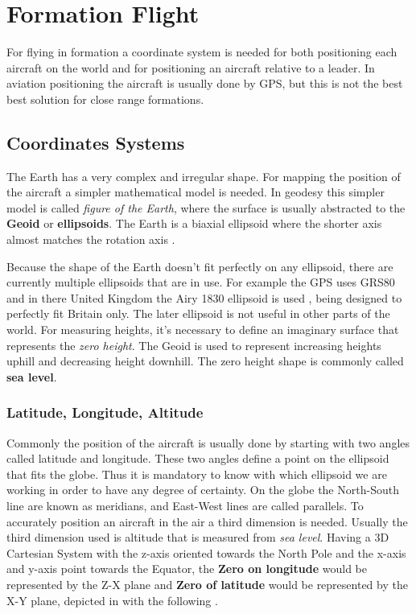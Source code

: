 \chapter{Formation Flight}
\label{chapter:formation-flight}
For flying in formation a coordinate system is needed for both positioning each 
aircraft on the world and for positioning an aircraft relative to a leader. In
aviation positioning the aircraft is usually done by GPS, but this is not the best best solution for close range formations.

\section{Coordinates Systems}
\label{sec:coordinates-systems}
The Earth has a very complex and irregular shape. For mapping the position of
the aircraft a simpler mathematical model is needed. In geodesy this simpler
model is called \textit{figure of the Earth}, where the surface is usually
abstracted to the \textbf{Geoid} or \textbf{ellipsoids}. The Earth is a biaxial 
ellipsoid where the shorter axis almost matches the rotation axis \cite{gb-coordinates}.

Because the shape of the Earth doesn't fit perfectly on any ellipsoid, there
are currently multiple ellipsoids that are in use. For example the GPS uses
GRS80 \cite{gsr80} and in there
United Kingdom the Airy 1830 ellipsoid is used \cite{gb-coordinates},  being 
designed to perfectly fit Britain only. The later ellipsoid is not useful in 
other parts of the world. For measuring heights, it's necessary to define an
imaginary surface that represents the \textit{zero height}. The Geoid is used
to represent increasing heights uphill and decreasing height downhill. The
zero height shape is commonly called \textbf{sea level}.

\subsection{Latitude, Longitude,  Altitude}
\label{sub-sec:lla}
Commonly the position of the aircraft is usually done by starting with 
two angles called latitude and longitude. These two angles define a point
on the ellipsoid that fits the globe. Thus it is mandatory to know with which
ellipsoid we are working in order to have any degree of certainty. On the globe
the North-South line are known as meridians,  and East-West lines are called 
parallels. To accurately position an aircraft in the air a third dimension is needed.
Usually the third dimension used is altitude that is measured from \textit{sea level}.
Having a 3D Cartesian System with the z-axis oriented towards the North Pole and
the x-axis and y-axis point towards the Equator, the \textbf{Zero on longitude}
would be represented by the Z-X plane and \textbf{Zero of latitude} would be 
represented by the X-Y plane, depicted in \cite{gb-coordinates} with the following
.
% 
\newpage

